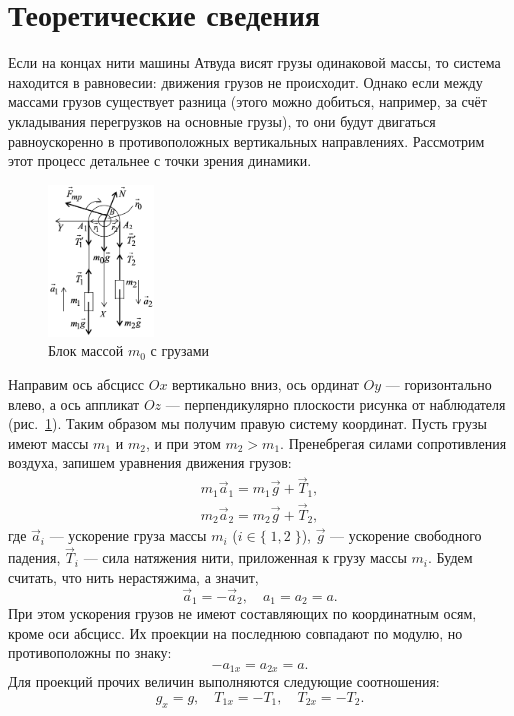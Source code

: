 \section{Теоретические сведения}

Если на концах нити машины Атвуда висят грузы одинаковой массы, то система находится в равновесии: движения грузов не происходит. Однако если между массами грузов существует разница (этого можно добиться, например, за счёт укладывания перегрузков на основные грузы), то они будут двигаться равноускоренно в противоположных вертикальных направлениях. Рассмотрим этот процесс детальнее с точки зрения динамики.

\begin{figure}
    \centering
    \includegraphics[width=0.25\textwidth]{pictures/PictureOne}
    \caption{Блок массой $m_0$ с грузами}\label{PictureOne}
\end{figure}
Направим ось абсцисс $Ox$ вертикально вниз, ось ординат $Oy$ --- горизонтально влево, а ось аппликат $Oz$ --- перпендикулярно плоскости рисунка от наблюдателя (рис.~\ref{PictureOne}). Таким образом мы получим правую систему координат. Пусть грузы имеют массы $m_1$ и $m_2$, и при этом $m_2>m_1$. Пренебрегая силами сопротивления воздуха, запишем уравнения движения грузов:
\begin{gather}
	m_1\vec a_1=m_1\vec g+\vec T_1, \\
	m_2\vec a_2=m_2\vec g+\vec T_2,
\end{gather}
где $\vec a_i$ --- ускорение груза массы $m_i$ ($i\in\{\;1,2\;\}$), $\vec g$ --- ускорение свободного падения, $\vec T_i$ --- сила натяжения нити, приложенная к грузу массы $m_i$. Будем считать, что нить нерастяжима, а значит,
\begin{equation}
	\vec a_1=-\vec a_2, \quad a_1=a_2=a.
\end{equation}
При этом ускорения грузов не имеют составляющих по координатным осям, кроме оси абсцисс. Их проекции на последнюю совпадают по модулю, но противоположны по знаку:
\begin{equation}
-a_{1x}=a_{2x}=a.
\end{equation}
Для проекций прочих величин выполняются следующие соотношения:
\begin{equation}
g_x=g,\quad T_{1x}=-T_1,\quad T_{2x}=-T_2.
\end{equation}

